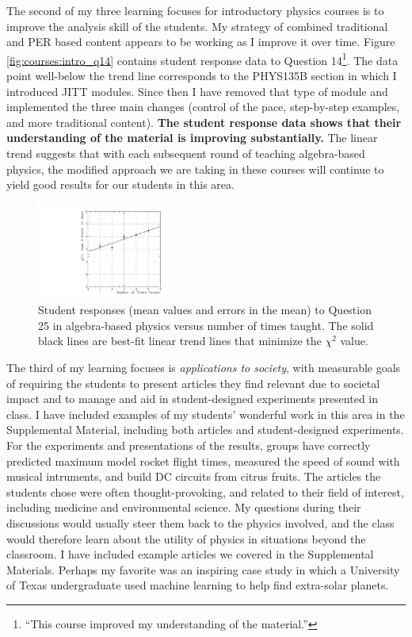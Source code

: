 \documentclass[../../main.tex]{subfiles}
\begin{document}
The second of my three learning focuses for introductory physics courses is to improve the analysis skill of the students.  My strategy of combined traditional and PER based content appears to be working as I improve it over time.  Figure \ref{fig:courses:intro_q14} contains student response data to Question 14\footnote{``This course  improved my understanding of the material.''}.  The data point well-below the trend line corresponds to the PHYS135B section in which I introduced JITT modules.  Since then I have removed that type of module and implemented the three main changes (control of the pace, step-by-step examples, and more traditional content).  \textbf{The student response data shows that their understanding of the material is improving substantially.}  The linear trend suggests that with each subsequent round of teaching algebra-based physics, the modified approach we are taking in these courses will continue to yield good results for our students in this area.  \\ \hspace{0.1cm}

\begin{figure}
\centering
\includegraphics[width=0.4\textwidth]{Q25_algebra_based.pdf}
\caption{\label{fig:courses:intro_q25}  Student responses (mean values and errors in the mean) to Question 25 in algebra-based physics versus number of times taught.  The solid black lines are best-fit linear trend lines that minimize the $\chi^2$ value.}
\end{figure}

The third of my learning focuses is \textit{applications to society}, with measurable goals of requiring the students to present articles they find relevant due to societal impact and to manage and aid in student-designed experiments presented in class.  I have included examples of my students' wonderful work in this area in the Supplemental Material, including both articles and student-designed experiments.  For the experiments and presentations of the results, groups have correctly predicted maximum model rocket flight times, measured the speed of sound with musical intruments, and build DC circuits from citrus fruits.  The articles the students chose were often thought-provoking, and related to their field of interest, including medicine and environmental science.  My questions during their discussions would usually steer them back to the physics involved, and the class would therefore learn about the utility of physics in situations beyond the classroom.  I have included example articles we covered in the Supplemental Materials.  Perhaps my favorite was an inspiring case study in which a University of Texas undergraduate used machine learning to help find extra-solar planets.
\end{document}
